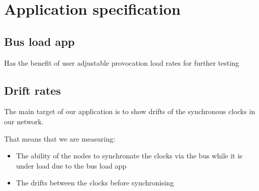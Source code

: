 \section{Application specification}

\subsection{Bus load app}
Has the benefit of user adjustable provocation load rates for 
further testing

\subsection{Drift rates}
The main target of our application is to show drifts of the synchronous 
clocks in our network. 

That means that we are measuring:
\begin{itemize}
 \item The ability of the nodes to synchronate the clocks via the bus 
while it is under load due to the bus load app
 \item The drifts between the clocks before synchronising
\end{itemize}